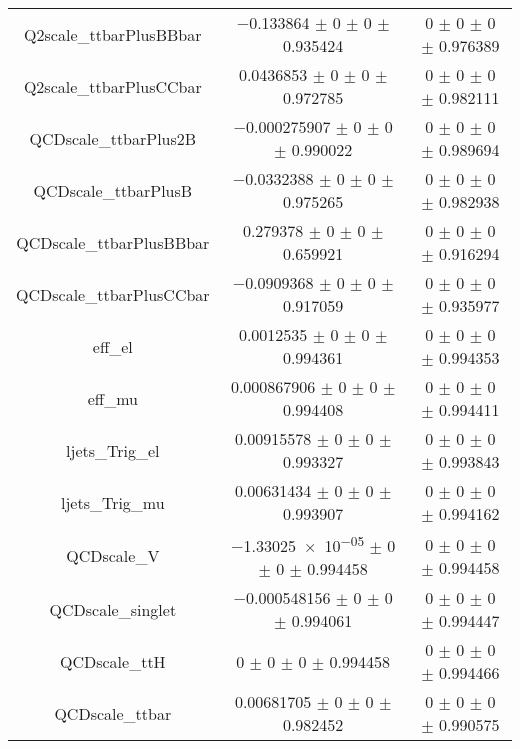 \begin{table}
\begin{tabular}{ccc}
Q2scale\_ttbarPlusBBbar & \num{-0.133864} $\pm$ \num{0} $\pm$ \num{0} $\pm$ \num{0.935424} & \num{0} $\pm$ \num{0} $\pm$ \num{0} $\pm$ \num{0.976389}\\
Q2scale\_ttbarPlusCCbar & \num{0.0436853} $\pm$ \num{0} $\pm$ \num{0} $\pm$ \num{0.972785} & \num{0} $\pm$ \num{0} $\pm$ \num{0} $\pm$ \num{0.982111}\\
QCDscale\_ttbarPlus2B & \num{-0.000275907} $\pm$ \num{0} $\pm$ \num{0} $\pm$ \num{0.990022} & \num{0} $\pm$ \num{0} $\pm$ \num{0} $\pm$ \num{0.989694}\\
QCDscale\_ttbarPlusB & \num{-0.0332388} $\pm$ \num{0} $\pm$ \num{0} $\pm$ \num{0.975265} & \num{0} $\pm$ \num{0} $\pm$ \num{0} $\pm$ \num{0.982938}\\
QCDscale\_ttbarPlusBBbar & \num{0.279378} $\pm$ \num{0} $\pm$ \num{0} $\pm$ \num{0.659921} & \num{0} $\pm$ \num{0} $\pm$ \num{0} $\pm$ \num{0.916294}\\
QCDscale\_ttbarPlusCCbar & \num{-0.0909368} $\pm$ \num{0} $\pm$ \num{0} $\pm$ \num{0.917059} & \num{0} $\pm$ \num{0} $\pm$ \num{0} $\pm$ \num{0.935977}\\
eff\_el & \num{0.0012535} $\pm$ \num{0} $\pm$ \num{0} $\pm$ \num{0.994361} & \num{0} $\pm$ \num{0} $\pm$ \num{0} $\pm$ \num{0.994353}\\
eff\_mu & \num{0.000867906} $\pm$ \num{0} $\pm$ \num{0} $\pm$ \num{0.994408} & \num{0} $\pm$ \num{0} $\pm$ \num{0} $\pm$ \num{0.994411}\\
ljets\_Trig\_el & \num{0.00915578} $\pm$ \num{0} $\pm$ \num{0} $\pm$ \num{0.993327} & \num{0} $\pm$ \num{0} $\pm$ \num{0} $\pm$ \num{0.993843}\\
ljets\_Trig\_mu & \num{0.00631434} $\pm$ \num{0} $\pm$ \num{0} $\pm$ \num{0.993907} & \num{0} $\pm$ \num{0} $\pm$ \num{0} $\pm$ \num{0.994162}\\
QCDscale\_V & \num{-1.33025e-05} $\pm$ \num{0} $\pm$ \num{0} $\pm$ \num{0.994458} & \num{0} $\pm$ \num{0} $\pm$ \num{0} $\pm$ \num{0.994458}\\
QCDscale\_singlet & \num{-0.000548156} $\pm$ \num{0} $\pm$ \num{0} $\pm$ \num{0.994061} & \num{0} $\pm$ \num{0} $\pm$ \num{0} $\pm$ \num{0.994447}\\
QCDscale\_ttH & \num{0} $\pm$ \num{0} $\pm$ \num{0} $\pm$ \num{0.994458} & \num{0} $\pm$ \num{0} $\pm$ \num{0} $\pm$ \num{0.994466}\\
QCDscale\_ttbar & \num{0.00681705} $\pm$ \num{0} $\pm$ \num{0} $\pm$ \num{0.982452} & \num{0} $\pm$ \num{0} $\pm$ \num{0} $\pm$ \num{0.990575}\\

\end{tabular}
\end{table}

